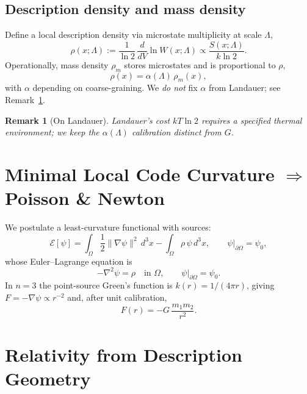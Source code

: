 \documentclass[aps,preprint,onecolumn,longbibliography,nofootinbib]{revtex4-2}
\numberwithin{equation}{section}        %
\newtheorem{remark}{Remark}
\begin{document}
\subsection{Description density and mass density}
Define a local description density via microstate multiplicity at scale $\Lambda$,
\begin{equation}
\rho(x;\Lambda) := \frac{1}{\ln 2}\,\frac{d}{dV}\ln W(x;\Lambda)\propto \frac{S(x;\Lambda)}{k\ln 2}.
\end{equation}
Operationally, mass density $\rho_m$ stores microstates and is proportional to $\rho$,
\begin{equation}
\rho(x) = \alpha(\Lambda)\,\rho_m(x), \label{eq:rho}
\end{equation}
with $\alpha$ depending on coarse-graining. We \emph{do not} fix $\alpha$ from Landauer; see Remark~\ref{rmk:landauer}.

\begin{remark}[On Landauer]\label{rmk:landauer}
Landauer’s cost $kT\ln 2$ requires a specified thermal environment; we keep the $\alpha(\Lambda)$ calibration distinct from $G$.
\end{remark}

\section{Minimal Local Code Curvature $\Rightarrow$ Poisson \& Newton}
We postulate a least-curvature functional with sources:
\begin{equation}
\mathcal{E}[\psi]=\int_{\Omega}\frac{1}{2}\|\nabla \psi\|^2\,d^3x - \int_{\Omega}\rho\,\psi\,d^3x, \qquad \psi|_{\partial\Omega}=\psi_0, \label{eq:dirichlet}
\end{equation}
whose Euler--Lagrange equation is
\begin{equation}
-\nabla^2\psi=\rho \quad \text{in }\Omega,\qquad \psi|_{\partial\Omega}=\psi_0. \label{eq:poisson}
\end{equation}
In $n=3$ the point-source Green's function is $k(r)=1/(4\pi r)$, giving $F=-\nabla\psi \propto r^{-2}$ and, after unit calibration,
\begin{equation}
F(r) = -G\,\frac{m_1 m_2}{r^2}. \label{eq:newton}
\end{equation}

\section{Relativity from Description Geometry}
\end{document}
